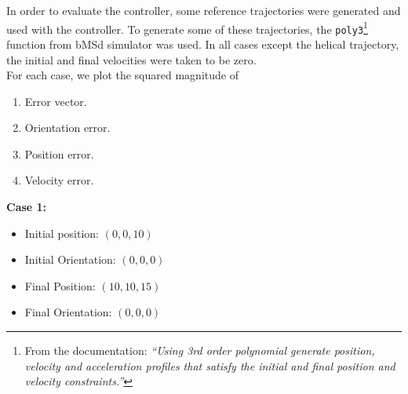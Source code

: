 \documentclass[12pt,fleqn]{article}
\begin{document}
In order to evaluate the controller, some reference trajectories were
generated and used with the controller. To generate some of these
trajectories, the \texttt{poly3}\footnote{From the documentation:
\textit{``Using 3rd order polynomial generate position, velocity and
acceleration profiles that satisfy the initial and final position and
velocity constraints.''}} function from bMSd simulator
\cite{courseWeb} was used. In all cases except the helical trajectory, the initial and final
velocities were taken to be zero. \\

For each case, we plot the squared magnitude of 
\begin{enumerate}
\item Error vector.
\item Orientation error.
\item Position error.
\item Velocity error.
\end{enumerate}
\newpage
\textbf{Case 1:}
\begin{itemize}
\item Initial position: $(0,0,10)$
\item Initial Orientation: $(0,0,0)$
\item Final Position: $(10,10,15)$
\item Final Orientation: $(0,0,0)$
\end{itemize}
\end{document}
